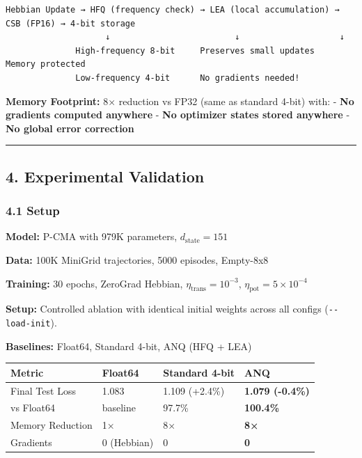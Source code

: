 \documentclass[
  11pt,
  a4paper,
]{article}
\begin{document}
\begin{verbatim}
Hebbian Update → HFQ (frequency check) → LEA (local accumulation) → CSB (FP16) → 4-bit storage
                    ↓                         ↓                    ↓
              High-frequency 8-bit     Preserves small updates   Memory protected
              Low-frequency 4-bit      No gradients needed!
\end{verbatim}

\textbf{Memory Footprint:} 8× reduction vs FP32 (same as standard 4-bit)
with: - \textbf{No gradients computed anywhere} - \textbf{No optimizer
states stored anywhere} - \textbf{No global error correction}

\begin{center}\rule{0.5\linewidth}{0.5pt}\end{center}

\subsection{4. Experimental Validation}\label{experimental-validation}

\subsubsection{4.1 Setup}\label{setup}

\textbf{Model:} P-CMA with 979K parameters, \(d_{\text{state}} = 151\)

\textbf{Data:} 100K MiniGrid trajectories, 5000 episodes, Empty-8x8

\textbf{Training:} 30 epochs, ZeroGrad Hebbian,
\(\eta_{\text{trans}} = 10^{-3}\),
\(\eta_{\text{pot}} = 5 \times 10^{-4}\)

\textbf{Setup:} Controlled ablation with identical initial weights
across all configs (\texttt{-\/-load-init}).

\textbf{Baselines:} Float64, Standard 4-bit, ANQ (HFQ + LEA)

\begin{longtable}[]{@{}llll@{}}
\toprule\noalign{}
Metric & Float64 & Standard 4-bit & \textbf{ANQ} \\
\midrule\noalign{}
\endhead
\bottomrule\noalign{}
\endlastfoot
Final Test Loss & 1.083 & 1.109 (+2.4\%) & \textbf{1.079 (-0.4\%)} \\
vs Float64 & baseline & 97.7\% & \textbf{100.4\%} \\
Memory Reduction & 1× & 8× & \textbf{8×} \\
Gradients & 0 (Hebbian) & 0 & \textbf{0} \\
\end{longtable}
\end{document}
